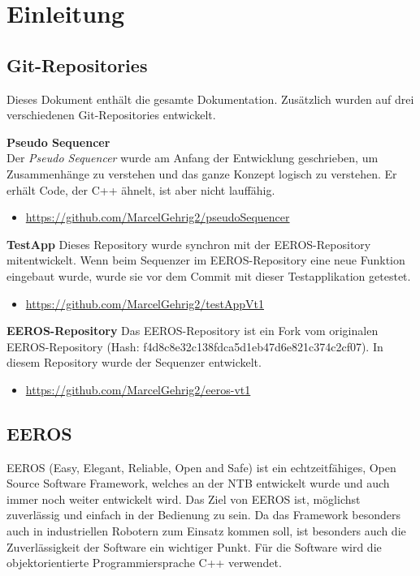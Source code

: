 \chapter{Einleitung}


\section{Git-Repositories}
Dieses Dokument enthält die gesamte Dokumentation.
Zusätzlich wurden auf drei verschiedenen Git-Repositories entwickelt.

\textbf{Pseudo Sequencer}\\
Der \textit{Pseudo Sequencer} wurde am Anfang der Entwicklung geschrieben, um Zusammenhänge zu verstehen und das ganze Konzept logisch zu verstehen.
Er erhält Code, der C++ ähnelt, ist aber nicht lauffähig.
\begin{itemize}
\item \url{https://github.com/MarcelGehrig2/pseudoSequencer}
\end{itemize}

\textbf{TestApp}
Dieses Repository wurde synchron mit der EEROS-Repository mitentwickelt.
Wenn beim Sequenzer im EEROS-Repository eine neue Funktion eingebaut wurde, wurde sie vor dem Commit mit dieser Testapplikation getestet.
\begin{itemize}
\item \url{https://github.com/MarcelGehrig2/testAppVt1}
\end{itemize}

\textbf{EEROS-Repository}
Das EEROS-Repository ist ein Fork vom originalen EEROS-Repository (Hash: f4d8c8e32c138fdca5d1eb47d6e821c374c2cf07).
In diesem Repository wurde der Sequenzer entwickelt.
\begin{itemize}
\item \url{https://github.com/MarcelGehrig2/eeros-vt1}
\end{itemize}



\section{EEROS}
EEROS (Easy, Elegant, Reliable, Open and Safe) ist ein echtzeitfähiges, Open Source Software Framework, welches an der NTB entwickelt wurde und auch immer noch weiter entwickelt wird. 
Das Ziel von EEROS ist, möglichst zuverlässig und einfach in der Bedienung zu sein.
Da das Framework besonders auch in industriellen Robotern zum Einsatz kommen soll, ist besonders auch die Zuverlässigkeit der Software ein wichtiger Punkt.
Für die Software wird die objektorientierte Programmiersprache C++ verwendet. %


